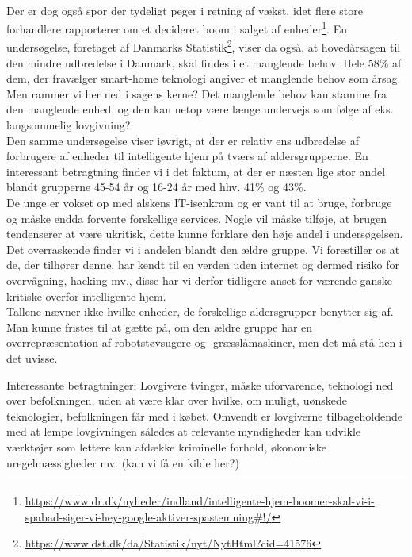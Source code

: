 \documentclass{article}
\begin{document}
\paragraph{}
Der er dog også spor der tydeligt peger i retning af vækst, idet flere store forhandlere rapporterer om et decideret boom i salget af enheder\footnote{\url{https://www.dr.dk/nyheder/indland/intelligente-hjem-boomer-skal-vi-i-spabad-siger-vi-hey-google-aktiver-spastemning\#!/}}.
En undersøgelse, foretaget af Danmarks Statistik\footnote{\url{https://www.dst.dk/da/Statistik/nyt/NytHtml?cid=41576}}, viser da også, at hovedårsagen til den mindre udbredelse i Danmark, skal findes i et manglende behov. Hele 58\% af dem, der fravælger smart-home teknologi angiver et manglende behov som årsag. \\
Men rammer vi her ned i sagens kerne? Det manglende behov kan stamme fra den manglende enhed, og den kan netop være længe undervejs som følge af eks. langsommelig lovgivning?\\
Den samme undersøgelse viser iøvrigt, at der er relativ ens udbredelse af forbrugere af enheder til intelligente hjem på tværs af aldersgrupperne. En interessant betragtning finder vi i det faktum, at der er næsten lige stor andel blandt grupperne 45-54 år og 16-24 år med hhv. 41\% og 43\%. \\
De unge er vokset op med alskens IT-isenkram og er vant til at bruge, forbruge og måske endda forvente forskellige services. Nogle vil måske tilføje, at brugen tendenserer at være ukritisk, dette kunne forklare den høje andel i undersøgelsen.\\
Det overraskende finder vi i andelen blandt den ældre gruppe. Vi forestiller os at de, der tilhører denne, har kendt til en verden uden internet og dermed risiko for overvågning, hacking mv., disse har vi derfor tidligere anset for værende ganske kritiske overfor intelligente hjem. \\
Tallene nævner ikke hvilke enheder, de forskellige aldersgrupper benytter sig af. Man kunne fristes til at gætte på, om den ældre gruppe har en overrepræsentation af robotstøvsugere og -græsslåmaskiner, men det må stå hen i det uvisse.



Interessante betragtninger: Lovgivere tvinger, måske uforvarende, teknologi ned over befolkningen, uden at være klar over hvilke, om muligt, uønskede teknologier, befolkningen får med i købet.
Omvendt er lovgiverne tilbageholdende med at lempe lovgivningen således at relevante myndigheder kan udvikle værktøjer som lettere kan afdække kriminelle forhold, økonomiske uregelmæssigheder mv. (kan vi få en kilde her?)
\end{document}
